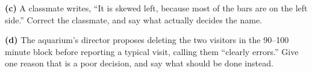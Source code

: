\documentclass[12pt]{article}
\begin{document}
\begin{enumerate}[leftmargin=1.9em, itemsep=0.16in, resume]
        \boxguard[15]
        \vspace{6pt}
        \textbf{(c)} A classmate writes, ``It is skewed left, because most of the bars are on the
        left side.'' Correct the classmate, and say what actually decides the name.\\[4pt]

        \boxguard[15]
        \vspace{6pt}
        \textbf{(d)} The aquarium's director proposes deleting the two visitors in the 90--100
        minute block before reporting a typical visit, calling them ``clearly errors.'' Give one
        reason that is a poor decision, and say what should be done instead.\\[4pt]

\end{enumerate}
\end{document}
